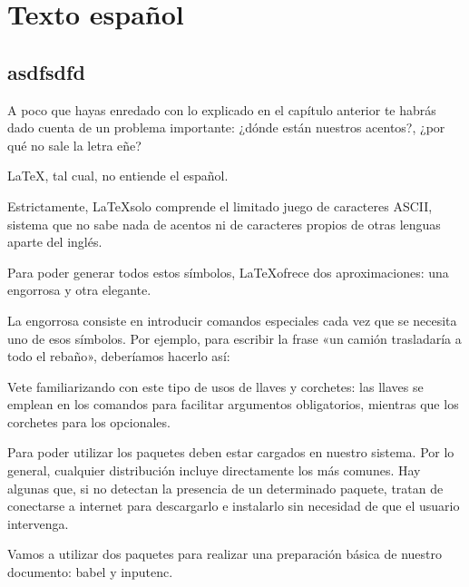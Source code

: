\chapter{Texto español}

\section{ asdfsdfd }
A poco que hayas enredado con lo explicado en el capítulo anterior te habrás dado cuenta de un problema importante: ¿dónde están nuestros acentos?, ¿por qué no sale la letra eñe?

\LaTeX, tal cual, no entiende el español.

Estrictamente, \LaTeX solo comprende el limitado juego de caracteres ASCII, sistema que no sabe nada de acentos ni de caracteres propios de otras lenguas aparte del inglés.

Para poder generar todos estos símbolos, \LaTeX ofrece dos aproximaciones: una engorrosa y otra elegante.

La engorrosa consiste en introducir comandos especiales cada vez que se necesita uno de esos símbolos. Por ejemplo, para escribir la frase «un camión trasladaría a todo el rebaño», deberíamos hacerlo así:

Vete familiarizando con este tipo de usos de llaves y corchetes: las llaves se emplean en los comandos para facilitar argumentos obligatorios, mientras que los corchetes para los opcionales.

Para poder utilizar los paquetes deben estar cargados en nuestro sistema. Por lo general, cualquier distribución incluye directamente los más comunes. Hay algunas que, si no detectan la presencia de un determinado paquete, tratan de conectarse a internet para descargarlo e instalarlo sin necesidad de que el usuario intervenga.

Vamos a utilizar dos paquetes para realizar una preparación básica de nuestro documento: babel y inputenc.

